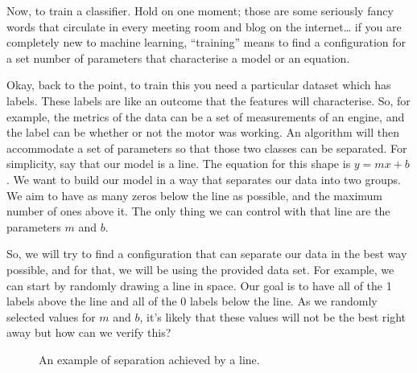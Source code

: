 \documentclass[a4,12pt,twosided,openany]{memoir}
\begin{document}
\par 
\indent
Now, to train a classifier. Hold on one moment; those are some seriously fancy words that circulate in every meeting room and blog on the internet… if you are completely new to machine learning, “training” means to find a configuration for a set number of parameters that characterise a model or an equation. 
\par 
\indent
Okay, back to the point, to train this you need a particular dataset which has labels. These labels are like an outcome that the features will characterise. So, for example, the metrics of the data can be a set of measurements of an engine, and the label can be whether or not the motor was working. An algorithm will then accommodate a set of parameters so that those two classes can be separated. For simplicity, say that our model is a line. The equation for this shape is $y=mx+b$. We want to build our model in a way that separates our data into two groups. We aim to have as many zeros below the line as possible, and the maximum number of ones above it. The only thing we can control with that line are the parameters $m$ and $b$. 
\par 
\indent
So, we will try to find a configuration that can separate our data in the best way possible, and for that, we will be using the provided data set. For example, we can start by randomly drawing a line in space. Our goal is to have all of the 1 labels above the line and all of the 0 labels below the line. As we randomly selected values for $m$ and $b$, it’s likely that these values will not be the best right away but how can we verify this?
\begin{figure}[h!]
\begin{center}
\end{center}
\caption{An example of separation achieved by a line.}
\end{figure}
\end{document}
